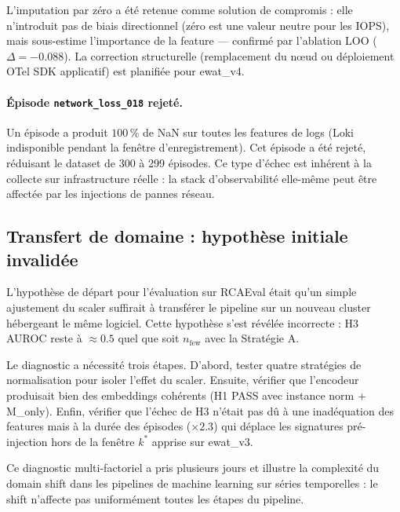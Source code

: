L'imputation par zéro a été retenue comme solution de compromis : elle n'introduit pas
de biais directionnel (zéro est une valeur neutre pour les IOPS), mais sous-estime
l'importance de la feature --- confirmé par l'ablation LOO ($\Delta = -0.088$).
La correction structurelle (remplacement du nœud ou déploiement OTel SDK applicatif)
est planifiée pour ewat\_v4.

\paragraph{Épisode \texttt{network\_loss\_018} rejeté.}
Un épisode a produit $100$\,\% de NaN sur toutes les features de logs (Loki indisponible
pendant la fenêtre d'enregistrement). Cet épisode a été rejeté, réduisant le dataset
de 300 à 299 épisodes. Ce type d'échec est inhérent à la collecte sur infrastructure
réelle : la stack d'observabilité elle-même peut être affectée par les injections
de pannes réseau.

\subsection{Transfert de domaine : hypothèse initiale invalidée}
\label{sec:diff_transfer}

L'hypothèse de départ pour l'évaluation sur RCAEval était qu'un simple ajustement
du scaler suffirait à transférer le pipeline sur un nouveau cluster hébergeant le même
logiciel. Cette hypothèse s'est révélée incorrecte : H3 AUROC reste à $\approx 0.5$
quel que soit $n_\text{few}$ avec la Stratégie A.

Le diagnostic a nécessité trois étapes. D'abord, tester quatre stratégies de
normalisation pour isoler l'effet du scaler. Ensuite, vérifier que l'encodeur
produisait bien des embeddings cohérents (H1 PASS avec instance norm + M\_only).
Enfin, vérifier que l'échec de H3 n'était pas dû à une inadéquation des features mais
à la durée des épisodes ($\times 2.3$) qui déplace les signatures pré-injection
hors de la fenêtre $k^*$ apprise sur ewat\_v3.

Ce diagnostic multi-factoriel a pris plusieurs jours et illustre la complexité du
domain shift dans les pipelines de machine learning sur séries temporelles :
le shift n'affecte pas uniformément toutes les étapes du pipeline.
